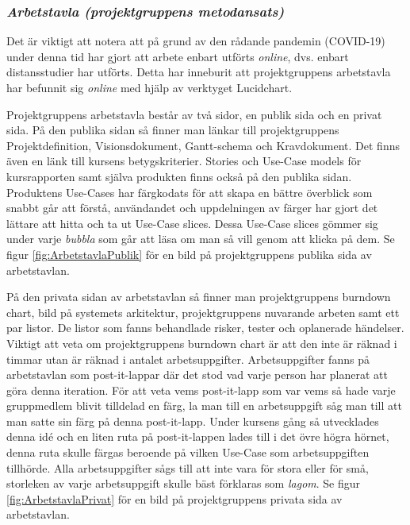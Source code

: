 \documentclass[conference]{IEEEtran}
\begin{document}
\subsubsection{\textit{Arbetstavla (projektgruppens metodansats)}}
Det är viktigt att notera att på grund av den rådande pandemin (COVID-19) under denna tid har gjort att arbete enbart utförts \textit{online}, dvs. enbart distansstudier har utförts. 
Detta har inneburit att projektgruppens arbetstavla har befunnit sig \textit{online} med hjälp av verktyget Lucidchart.

Projektgruppens arbetstavla består av två sidor, en publik sida och en privat sida. På den publika sidan så finner man länkar till projektgruppens 
Projektdefinition, Visionsdokument, Gantt-schema och Kravdokument. Det finns även en länk till kursens betygskriterier. Stories och Use-Case models för 
kursrapporten samt själva produkten finns också på den publika sidan. Produktens Use-Cases har färgkodats för att skapa en bättre överblick som 
snabbt går att förstå, användandet och uppdelningen av färger har gjort det lättare att hitta och ta ut Use-Case slices. Dessa Use-Case slices gömmer 
sig under varje \textit{bubbla} som går att läsa om man så vill genom att klicka på dem. Se figur \ref{fig:ArbetstavlaPublik} för en bild på projektgruppens publika sida av arbetstavlan.

På den privata sidan av arbetstavlan så finner man projektgruppens burndown chart, bild på systemets arkitektur, projektgruppens nuvarande arbeten samt ett par 
listor. De listor som fanns behandlade risker, tester och oplanerade händelser. Viktigt att veta om projektgruppens burndown chart är att den inte är räknad i timmar 
utan är räknad i antalet arbetsuppgifter. Arbetsuppgifter fanns på arbetstavlan som post-it-lappar där det stod vad varje person har planerat att göra denna 
iteration. För att veta vems post-it-lapp som var vems så hade varje gruppmedlem blivit tilldelad en färg, la man till en arbetsuppgift såg man till att man satte 
sin färg på denna post-it-lapp. Under kursens gång så utvecklades denna idé och en liten ruta på post-it-lappen lades till i det övre högra hörnet, denna ruta skulle 
färgas beroende på vilken Use-Case som arbetsuppgiften tillhörde. Alla arbetsuppgifter sågs till att inte vara för stora eller för små, storleken av varje 
arbetsuppgift skulle bäst förklaras som \textit{lagom}. Se figur \ref{fig:ArbetstavlaPrivat} för en bild på projektgruppens privata sida av arbetstavlan.
\end{document}
